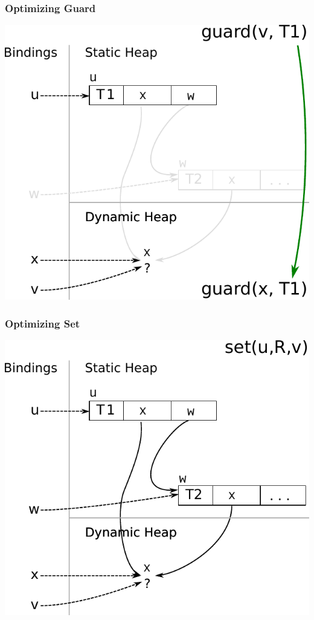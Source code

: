 \documentclass[utf8x]{beamer}
\begin{document}
\begin{frame}[plain]
  \frametitle{Optimizing Guard}
  \includegraphics[scale=0.8]{figures/opt_guard4}
\end{frame}

\begin{frame}[plain]
  \frametitle{Optimizing Set}
  \includegraphics[scale=0.8]{figures/opt_set1}
\end{frame}
\end{document}
